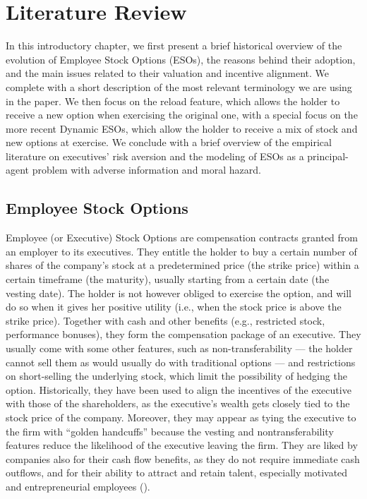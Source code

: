 \section{Literature Review}


In this introductory chapter, we first present a brief historical overview of the evolution of Employee Stock Options (ESOs), the reasons behind their adoption, and the main issues related to their valuation and incentive alignment. We complete with a short description of the most relevant terminology we are using in the paper. We then focus on the reload feature, which allows the holder to receive a new option when exercising the original one, with a special focus on the more recent Dynamic ESOs, which allow the holder to receive a mix of stock and new options at exercise. We conclude with a brief overview of the empirical literature on executives' risk aversion and the modeling of ESOs as a principal-agent problem with adverse information and moral hazard.


\subsection{Employee Stock Options} %
Employee (or Executive) Stock Options are compensation contracts granted from an employer to its executives. They entitle the holder to buy a certain number of shares of the company's stock at a predetermined price (the strike price) within a certain timeframe (the maturity), usually starting from a certain date (the vesting date). The holder is not however obliged to exercise the option, and will do so when it gives her positive utility (i.e., when the stock price is above the strike price).
Together with cash and other benefits (e.g., restricted stock, performance bonuses), they form the compensation package of an executive. They usually come with some other features, such as non-transferability --- the holder cannot sell them as would usually do with traditional options --- and restrictions on short-selling the underlying stock, which limit the possibility of hedging the option.
Historically, they have been used to align the incentives of the executive with those of the shareholders, as the executive's wealth gets closely tied to the stock price of the company. Moreover, they may appear as tying the executive to the firm with ``golden handcuffs'' because the vesting and nontransferability features reduce the likelihood of the executive leaving the firm. They are liked by companies also for their cash flow benefits, as they do not require immediate cash outflows, and for their ability to attract and retain talent, especially motivated and entrepreneurial employees (\cite{hall2003trouble}).

